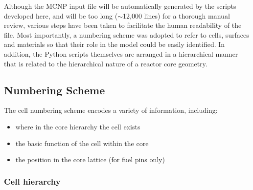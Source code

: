 \documentclass{UWNR_modeling}
\begin{document}
Although the MCNP input file will be automatically generated by the scripts developed here, and will be too long ($\sim$12,000 lines) for a thorough manual review, various steps have been taken to facilitate the human readability of the file.   Most importantly, a numbering scheme was adopted to refer to cells, surfaces and materials so that their role in the model could be easily identified.  In addition, the Python scripts themselves are arranged in a hierarchical manner that is related to the hierarchical nature of a reactor core geometry.

\subsection{Numbering Scheme}

The cell numbering scheme encodes a variety of information, including:
\begin{itemize}
\item where in the core hierarchy the cell exists
\item the basic function of the cell within the core
\item the position in the core lattice (for fuel pins only)
\end{itemize}

\subsubsection{Cell hierarchy}
\end{document}
